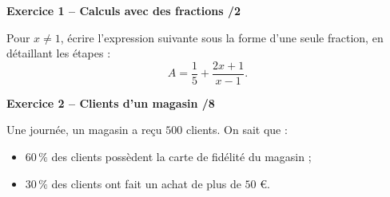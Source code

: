 \documentclass[10pt,a4paper]{article}
\begin{document}

\textbf{Exercice 1 -- Calculs avec des fractions \hfill /2}

Pour \(x\neq1\), écrire l'expression suivante sous la forme d'une seule fraction, en détaillant les étapes :
\[
A=\dfrac{1}{5}+\dfrac{2x+1}{x-1}.
\]

\vspace{2.3cm}

\textbf{Exercice 2 -- Clients d'un magasin \hfill /8}

Une journée, un magasin a reçu \(500\) clients. On sait que :
\begin{itemize}
\item \(60\,\%\) des clients possèdent la carte de fidélité du magasin ;
\item \(30\,\%\) des clients ont fait un achat de plus de \(50\) \euro.
\end{itemize}
\end{document}
